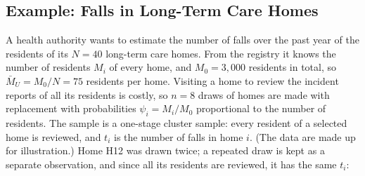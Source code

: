 \documentclass[
  letterpaper,
  DIV=11,
  numbers=noendperiod]{scrreprt}
\renewcommand{\[}{\begin{equation}}
\renewcommand{\]}{\end{equation}}
\begin{document}
\subsection{Example: Falls in Long-Term Care
Homes}\label{sec-ups-cluster-example}

A health authority wants to estimate the number of falls over the past
year of the residents of its \(N=40\) long-term care homes. From the
registry it knows the number of residents \(M_i\) of every home, and
\(M_0=3{,}000\) residents in total, so \(\bar{M}_U=M_0/N=75\) residents
per home. Visiting a home to review the incident reports of all its
residents is costly, so \(n=8\) draws of homes are made with replacement
with probabilities \(\psi_i=M_i/M_0\) proportional to the number of
residents. The sample is a one-stage cluster sample: every resident of a
selected home is reviewed, and \(t_i\) is the number of falls in home
\(i\). (The data are made up for illustration.) Home H12 was drawn
twice; a repeated draw is kept as a separate observation, and since all
its residents are reviewed, it has the same \(t_i\):
\end{document}

